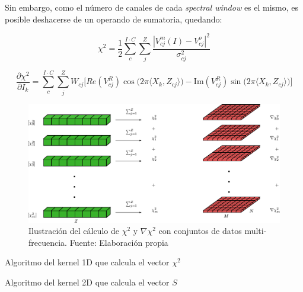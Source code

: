 Sin embargo, como el número de canales de cada \textit{spectral window} es el mismo, es posible deshacerse de un operando de sumatoria, quedando:

\begin{equation}
	\chi^{2} = \frac{1}{2}\sum_{c}^{I \cdot C}\sum_{j}^{Z}\frac{|V^m_{cj}(I)-V^o_{cj}|^2}{\sigma_{cj}^2}
	\label{eq:chi2-multi}
\end{equation}

\begin{equation}
	\frac{\partial\chi^{2}}{\partial I_{k}} = \sum_{c}^{I \cdot C}\sum_{j}^{Z} W_{cj}\biggl[Re(V_{cj}^{R})\cos\bigl(2\pi \langle X_k,Z_{cj}\rangle\bigr)-\text{Im}(V_{cj}^{R})\sin\bigl(2\pi \langle X_k,Z_{cj}\rangle\bigr)\biggr]
	\label{eq:dchi2-multi}
\end{equation}

\begin{figure}[h!]
	\centering
	\includegraphics[scale=0.75]{./images/matrixandvector.eps}
	\caption{Ilustración del cálculo de $\chi^{2}$ y $\nabla \chi^{2}$ con conjuntos de datos multi-frecuencia. Fuente: Elaboración propia}
	\label{fig:matrixandvector}
\end{figure}


\begin{algorithm}
	\begin{algorithmic}[1]
		\ENDIF
	\end{algorithmic}
	\caption{Algoritmo del kernel 1D que calcula el vector $\chi^{2}$}
	\label{alg:chi2}
\end{algorithm}

\begin{algorithm}
	\begin{algorithmic}[1]
	\end{algorithmic}
	\caption{Algoritmo del kernel 2D que calcula el vector $S$}
	\label{alg:S}
\end{algorithm}


